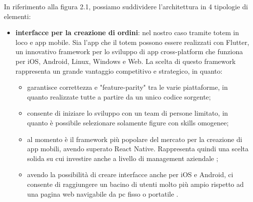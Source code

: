 \documentclass[a4paper, titlepage, 12pt, openright, oneside]{book}
\begin{document}
In riferimento alla figura 2.1, possiamo suddividere l'architettura in 4 tipologie di elementi:
\begin{itemize}
	\item \textbf{interfacce per la creazione di ordini}: nel nostro caso tramite totem in loco e app mobile. Sia l'app che il totem possono essere realizzati con Flutter, un innovativo framework per lo sviluppo di app cross-platform che funziona per iOS, Android, Linux, Windows e Web. La scelta di questo framework rappresenta un grande
				 vantaggio competitivo e strategico, in quanto:
				 \begin{itemize}
				 	\item garantisce correttezza e "feature-parity" tra le varie piattaforme, in quanto realizzate tutte a partire da un unico codice sorgente;
				 	\item consente di iniziare lo sviluppo con un team di persone limitato, in quanto è possibile selezionare solamente figure con skills omogenee;
				 	\item al momento è il framework più popolare del mercato per la creazione di app mobili, avendo superato React Native. Rappresenta quindi una scelta solida su cui investire anche a livello di management aziendale \cite{flutterreact};
				    \item avendo la possibilità di creare interfacce anche per iOS e Android, ci consente di raggiungere un bacino di utenti molto più ampio rispetto ad una pagina web
				    	  navigabile da pc fisso o portatile \cite{hardwaremob}.
				 \end{itemize}
				 

\end{itemize}
\end{document}
